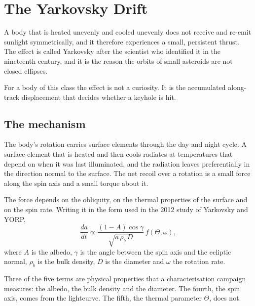 
\chapter{The Yarkovsky Drift}
\label{ch:yarkovsky}

A body that is heated unevenly and cooled unevenly does not receive and
re-emit sunlight symmetrically, and it therefore experiences a small,
persistent thrust. The effect is called Yarkovsky after the scientist who
identified it in the nineteenth century, and it is the reason the orbits of
small asteroids are not closed ellipses.

For a body of this class the effect is not a curiosity. It is the
accumulated along-track displacement that decides whether a keyhole is hit.

\section{The mechanism}

The body's rotation carries surface elements through the day and night
cycle. A surface element that is heated and then cools radiates at
temperatures that depend on when it was last illuminated, and the radiation
leaves preferentially in the direction normal to the surface. The net recoil
over a rotation is a small force along the spin axis and a small torque
about it.

The force depends on the obliquity, on the thermal properties of the surface
and on the spin rate. Writing it in the form used in the 2012 study of
Yarkovsky and YORP,
\begin{equation}
\frac{d a}{d t} \propto
\frac{(1-A)\cos\gamma}{\sqrt{a\,\rho_b\,D}}\,
f(\Theta, \omega),
\label{eq:yarkovsky}
\end{equation}
where \(A\) is the albedo, \(\gamma\) is the angle between the spin axis and
the ecliptic normal, \(\rho_b\) is the bulk density, \(D\) is the diameter and
\(\omega\) the rotation rate.

Three of the five terms are physical properties that a characterisation
campaign measures: the albedo, the bulk density and the diameter. The
fourth, the spin axis, comes from the lightcurve. The fifth, the thermal
parameter \(\Theta\), does not.

